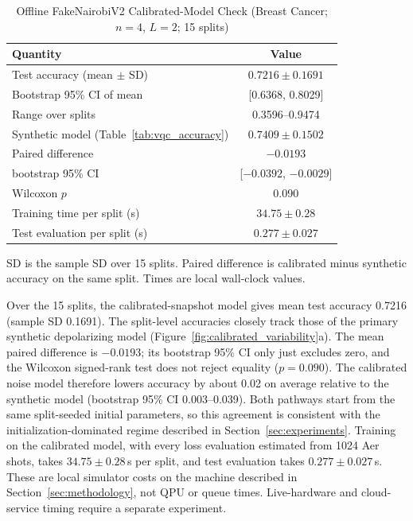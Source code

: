 \documentclass[final,5p,times,number]{elsarticle}
\begin{document}
\begin{table}[!htbp]
  \centering
  \caption{Offline FakeNairobiV2 Calibrated-Model Check (Breast Cancer; $n=4$, $L=2$; 15 splits)}
  \label{tab:hardware_comparison}
  \small
  \setlength{\tabcolsep}{4pt}
  \begin{tabular}{lc}
    \toprule
    \textbf{Quantity} & \textbf{Value} \\
    \midrule
    Test accuracy (mean $\pm$ SD) & $0.7216\pm0.1691$ \\
    Bootstrap 95\% CI of mean & [0.6368, 0.8029] \\
    Range over splits & 0.3596--0.9474 \\
    Synthetic model (Table~\ref{tab:vqc_accuracy}) & $0.7409\pm0.1502$ \\
    Paired difference & $-0.0193$ \\
    \quad bootstrap 95\% CI & [$-0.0392$, $-0.0029$] \\
    \quad Wilcoxon $p$ & 0.090 \\
    Training time per split (s) & $34.75\pm0.28$ \\
    Test evaluation per split (s) & $0.277\pm0.027$ \\
    \bottomrule
  \end{tabular}
  \begin{tablenotes}
    \small
    \item SD is the sample SD over 15 splits. Paired difference is calibrated minus synthetic accuracy on the same split. Times are local wall-clock values.
  \end{tablenotes}
\end{table}

Over the 15 splits, the calibrated-snapshot model gives mean test accuracy 0.7216 (sample SD 0.1691). The split-level accuracies closely track those of the primary synthetic depolarizing model (Figure~\ref{fig:calibrated_variability}a). The mean paired difference is $-0.0193$; its bootstrap 95\% CI only just excludes zero, and the Wilcoxon signed-rank test does not reject equality ($p=0.090$). The calibrated noise model therefore lowers accuracy by about 0.02 on average relative to the synthetic model (bootstrap 95\% CI 0.003--0.039). Both pathways start from the same split-seeded initial parameters, so this agreement is consistent with the initialization-dominated regime described in Section~\ref{sec:experiments}. Training on the calibrated model, with every loss evaluation estimated from 1024 Aer shots, takes $34.75\pm0.28$\,s per split, and test evaluation takes $0.277\pm0.027$\,s. These are local simulator costs on the machine described in Section~\ref{sec:methodology}, not QPU or queue times. Live-hardware and cloud-service timing require a separate experiment.
\end{document}
